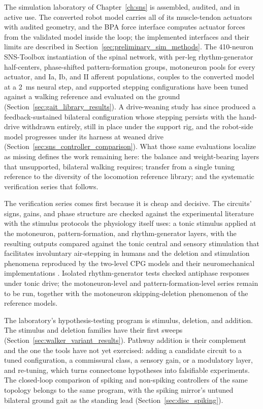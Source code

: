 The simulation laboratory of Chapter~\ref{ch:sns} is assembled, audited, and in active use. The converted robot model carries all of its muscle-tendon actuators with audited geometry, and the BPA force interface computes actuator forces from the validated model inside the loop; the implemented interfaces and their limits are described in Section~\ref{sec:preliminary_sim_methods}. The 410-neuron SNS-Toolbox instantiation of the spinal network, with per-leg rhythm-generator half-centers, phase-shifted pattern-formation groups, motoneuron pools for every actuator, and Ia, Ib, and II afferent populations, couples to the converted model at a \qty{2}{\milli\second} neural step, and supported stepping configurations have been tuned against a walking reference and evaluated on the ground (Section~\ref{sec:gait_library_results}). A drive-weaning study has since produced a feedback-sustained bilateral configuration whose stepping persists with the hand-drive withdrawn entirely, still in place under the support rig, and the robot-side model progresses under its harness at weaned drive (Section~\ref{sec:sns_controller_comparison}). What those same evaluations localize as missing defines the work remaining here: the balance and weight-bearing layers that unsupported, bilateral walking requires; transfer from a single tuning reference to the diversity of the locomotion reference library; and the systematic verification series that follows.

The verification series comes first because it is cheap and decisive. The circuits' signs, gains, and phase structure are checked against the experimental literature with the stimulus protocols the physiology itself uses: a tonic stimulus applied at the motoneuron, pattern-formation, and rhythm-generator layers, with the resulting outputs compared against the tonic central and sensory stimulation that facilitates involuntary air-stepping in humans \citep{selionov_tonic_2009} and the deletion and stimulation phenomena reproduced by the two-level CPG models and their neuromechanical implementations \citep{rybak_modelling_2006, markin_afferent_2010, shevtsova_modeling_2016}. Isolated rhythm-generator tests checked antiphase responses under tonic drive; the motoneuron-level and pattern-formation-level series remain to be run, together with the motoneuron skipping-deletion phenomenon of the reference models.

The laboratory's hypothesis-testing program is stimulus, deletion, and addition. The stimulus and deletion families have their first sweeps (Section~\ref{sec:walker_variant_results}). Pathway addition is their complement and the one the tools have not yet exercised: adding a candidate circuit to a tuned configuration, a commissural class, a sensory gain, or a modulatory layer, and re-tuning, which turns connectome hypotheses into falsifiable experiments. The closed-loop comparison of spiking and non-spiking controllers of the same topology belongs to the same program, with the spiking mirror's untuned bilateral ground gait as the standing lead (Section~\ref{sec:disc_spiking}).


